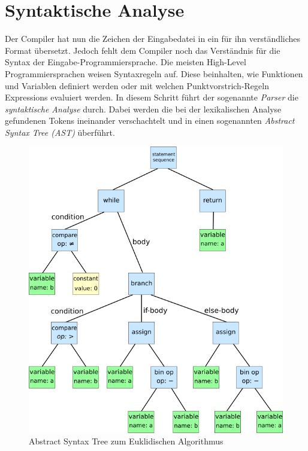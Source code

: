 \section{Syntaktische Analyse}
Der Compiler hat nun die Zeichen der Eingabedatei in ein für ihn verständliches Format übersetzt.
Jedoch fehlt dem Compiler noch das Verständnis für die Syntax der Eingabe-Programmiersprache.
Die meisten High-Level Programmiersprachen weisen Syntaxregeln auf. Diese beinhalten, wie Funktionen und Variablen definiert werden oder mit welchen Punktvorstrich-Regeln Expressions evaluiert werden.
In diesem Schritt führt der sogenannte \textit{Parser} die \textit{syntaktische Analyse} durch.
Dabei werden die bei der lexikalischen Analyse gefundenen Tokens ineinander verschachtelt und in einen sogenannten \textit{Abstract Syntax Tree (AST)} überführt.

\begin{figure}[H]
    \centering
    \includegraphics[scale=0.3]{resources/images/syntaxtree.svg.png}
    \caption[Abstract Syntax Tree (https://en.wikipedia.org/wiki/Abstract\_syntax\_tree, besucht am 5.8.2024)]{Abstract Syntax Tree zum Euklidischen Algorithmus}
    \label{fig:syntax-tree}
\end{figure}

